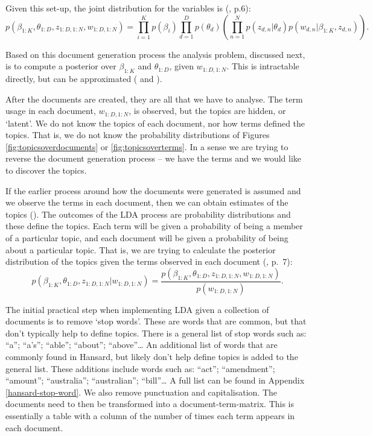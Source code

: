 \documentclass[12pt,]{article}
\theoremstyle{definition}
\theoremstyle{definition}
\theoremstyle{definition}
\theoremstyle{remark}
\begin{document}
Given this set-up, the joint distribution for the variables is
(\citet{blei2012}, p.6):
\[p(\beta_{1:K}, \theta_{1:D}, z_{1:D, 1:N}, w_{1:D, 1:N}) = \prod^{K}_{i=1}p(\beta_i) \prod^{D}_{d=1}p(\theta_d) \left(\prod^N_{n=1}p(z_{d,n}|\theta_d)p\left(w_{d,n}|\beta_{1:K},z_{d,n}\right) \right).\]

Based on this document generation process the analysis problem,
discussed next, is to compute a posterior over \(\beta_{1:K}\) and
\(\theta_{1:D}\), given \(w_{1:D, 1:N}\). This is intractable directly,
but can be approximated (\citet{GriffithsSteyvers2004} and
\citet{blei2012}).

After the documents are created, they are all that we have to analyse.
The term usage in each document, \(w_{1:D, 1:N}\), is observed, but the
topics are hidden, or `latent'. We do not know the topics of each
document, nor how terms defined the topics. That is, we do not know the
probability distributions of Figures \ref{fig:topicsoverdocuments} or
\ref{fig:topicsoverterms}. In a sense we are trying to reverse the
document generation process -- we have the terms and we would like to
discover the topics.

If the earlier process around how the documents were generated is
assumed and we observe the terms in each document, then we can obtain
estimates of the topics (\citet{SteyversGriffiths2006}). The outcomes of
the LDA process are probability distributions and these define the
topics. Each term will be given a probability of being a member of a
particular topic, and each document will be given a probability of being
about a particular topic. That is, we are trying to calculate the
posterior distribution of the topics given the terms observed in each
document (\citet{blei2012}, p.~7):
\[p(\beta_{1:K}, \theta_{1:D}, z_{1:D, 1:N} | w_{1:D, 1:N}) = \frac{p\left(\beta_{1:K}, \theta_{1:D}, z_{1:D, 1:N}, w_{1:D, 1:N}\right)}{p(w_{1:D, 1:N})}.\]

The initial practical step when implementing LDA given a collection of
documents is to remove `stop words'. These are words that are common,
but that don't typically help to define topics. There is a general list
of stop words such as: ``a''; ``a's''; ``able''; ``about'';
``above''\ldots{} An additional list of words that are commonly found in
Hansard, but likely don't help define topics is added to the general
list. These additions include words such as: ``act''; ``amendment'';
``amount''; ``australia''; ``australian''; ``bill''\ldots{} A full list
can be found in Appendix \ref{hansard-stop-word}. We also remove
punctuation and capitalisation. The documents need to then be
transformed into a document-term-matrix. This is essentially a table
with a column of the number of times each term appears in each document.
\end{document}
